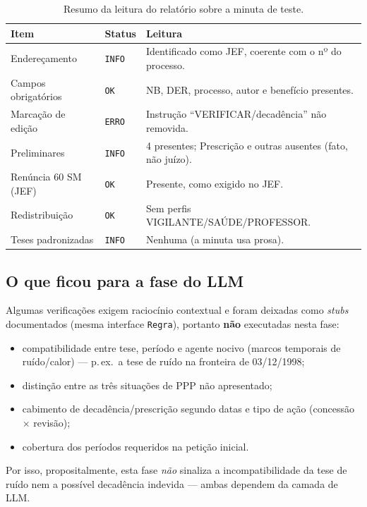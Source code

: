 \documentclass[11pt,a4paper]{article}
\newcommand{\status}[1]{\texttt{#1}}
\begin{document}
\begin{table}[h]
\centering
\small
\begin{tabular}{@{}llp{7.6cm}@{}}
\toprule
\textbf{Item} & \textbf{Status} & \textbf{Leitura} \\
\midrule
Endereçamento & \status{INFO}  & Identificado como JEF, coerente com o nº do processo. \\
Campos obrigatórios & \status{OK} & NB, DER, processo, autor e benefício presentes. \\
Marcação de edição & \status{ERRO} & Instrução ``VERIFICAR/decadência'' não removida. \\
Preliminares & \status{INFO} & 4 presentes; Prescrição e outras ausentes (fato, não juízo). \\
Renúncia 60 SM (JEF) & \status{OK} & Presente, como exigido no JEF. \\
Redistribuição & \status{OK} & Sem perfis VIGILANTE/SAÚDE/PROFESSOR. \\
Teses padronizadas & \status{INFO} & Nenhuma (a minuta usa prosa). \\
\bottomrule
\end{tabular}
\caption{Resumo da leitura do relatório sobre a minuta de teste.}
\end{table}

\subsection{O que ficou para a fase do LLM}
Algumas verificações exigem raciocínio contextual e foram deixadas como
\emph{stubs} documentados (mesma interface \texttt{Regra}), portanto
\textbf{não} executadas nesta fase:
\begin{itemize}[leftmargin=1.4em]
  \item compatibilidade entre tese, período e agente nocivo (marcos temporais
        de ruído/calor) --- p.\,ex.\ a tese de ruído na fronteira de 03/12/1998;
  \item distinção entre as três situações de PPP não apresentado;
  \item cabimento de decadência/prescrição segundo datas e tipo de ação
        (concessão $\times$ revisão);
  \item cobertura dos períodos requeridos na petição inicial.
\end{itemize}

Por isso, propositalmente, esta fase \emph{não} sinaliza a incompatibilidade da
tese de ruído nem a possível decadência indevida --- ambas dependem da camada de
LLM.
\end{document}

